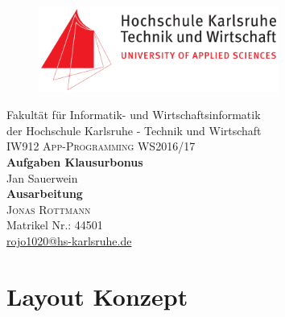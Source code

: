 \documentclass[11pt, oneside]{article}
\begin{document}
\hypersetup{pageanchor=false}
\thispagestyle{empty}

\begin{figure}
\centering
\includegraphics[height=80pt]{hska_logo.png}
\end{figure}

\begin{center}

\large{Fakultät für Informatik- und Wirtschaftsinformatik \\
der Hochschule Karlsruhe - Technik und Wirtschaft \\}
\vspace{5mm}
\large{\textsc{IW912 App-Programming WS2016/17}} \\
\vspace{3mm}
\fontsize{16pt}{7pt}\selectfont\textbf{Aufgaben Klausurbonus} \\
\vspace{5mm}
Jan Sauerwein\\
\vspace{10mm}
\large{\textbf{Ausarbeitung}} \\
\vspace{10mm}
\textsc{Jonas Rottmann}\\
Matrikel Nr.: 44501\\
\href{mailto:rojo1020@hs-karlsruhe.de}{rojo1020@hs-karlsruhe.de}\\[2mm]

\end{center}
\newpage


\tableofcontents %
\newpage


\section{Layout Konzept}
\end{document}
